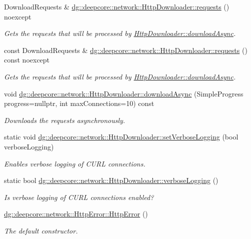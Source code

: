 \begin{DoxyCompactItemize}
Download\+Requests \& \hyperlink{group___network_module_ga93ed91ce22dd499848d0f42e683d64d5}{dg\+::deepcore\+::network\+::\+Http\+Downloader\+::requests} () noexcept
\begin{DoxyCompactList}\small\item\em Gets the requests that will be processed by \hyperlink{group___network_module_ga5a3dc48bb7c2c0e14ce394c515742b47}{Http\+Downloader\+::download\+Async}. \end{DoxyCompactList}\item 
const Download\+Requests \& \hyperlink{group___network_module_ga3c0af4cc2f8ea2880e48173183fdb758}{dg\+::deepcore\+::network\+::\+Http\+Downloader\+::requests} () const noexcept
\begin{DoxyCompactList}\small\item\em Gets the requests that will be processed by \hyperlink{group___network_module_ga5a3dc48bb7c2c0e14ce394c515742b47}{Http\+Downloader\+::download\+Async}. \end{DoxyCompactList}\item 
void \hyperlink{group___network_module_ga5a3dc48bb7c2c0e14ce394c515742b47}{dg\+::deepcore\+::network\+::\+Http\+Downloader\+::download\+Async} (Simple\+Progress progress=nullptr, int max\+Connections=10) const 
\begin{DoxyCompactList}\small\item\em Downloads the requests asynchronously. \end{DoxyCompactList}\item 
static void \hyperlink{group___network_module_ga4aa457ededfdc5fcb0db52f7215909cb}{dg\+::deepcore\+::network\+::\+Http\+Downloader\+::set\+Verbose\+Logging} (bool verbose\+Logging)
\begin{DoxyCompactList}\small\item\em Enables verbose logging of C\+U\+RL connections. \end{DoxyCompactList}\item 
static bool \hyperlink{group___network_module_ga2470c65fd9d6dd62854a9c9e7df877c6}{dg\+::deepcore\+::network\+::\+Http\+Downloader\+::verbose\+Logging} ()
\begin{DoxyCompactList}\small\item\em Is verbose logging of C\+U\+RL connections enabled? \end{DoxyCompactList}\item 
\hyperlink{group___network_module_ga14eeb0f4441dfb8f75d82c0cd940c0ec}{dg\+::deepcore\+::network\+::\+Http\+Error\+::\+Http\+Error} ()
\begin{DoxyCompactList}\small\item\em The default constructor. \end{DoxyCompactList}\item 

\end{DoxyCompactItemize}
